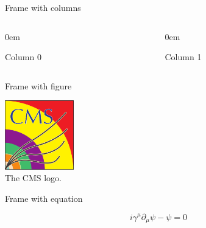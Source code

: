 \documentclass[10pt]{beamer}
\begin{document}
\begin{frame}[fragile]{Frame with columns}
\vspace{-0.5cm}
\begin{columns}
\begin{column}{0.5\textwidth}
\begin{itemize}\scriptsize{
\itemsep0em
\item Column 0}
\end{itemize}
\end{column}
\begin{column}{0.5\textwidth}
\begin{itemize}\scriptsize{
\itemsep0em
\item Column 1}
\end{itemize}
\end{column}
\end{columns}
\end{frame}

\begin{frame}[fragile]{Frame with figure}

\center
\includegraphics[width=3cm]{CMS-Color-Var1.pdf}\\
\scriptsize{The CMS logo.}\\


\end{frame}

\begin{frame}[fragile]{Frame with equation}

$$i\gamma^{\mu}\partial_{\mu}\psi-\psi=0$$
\end{frame}
\end{document}
